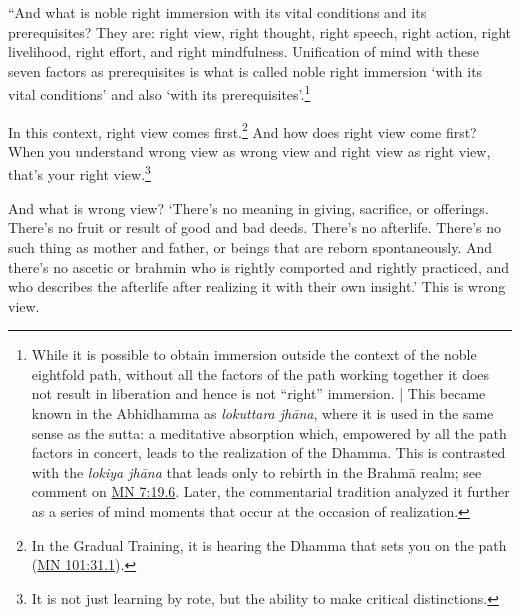 \documentclass[12pt,openany]{book}%
\begin{document}
“And what is noble right immersion with its vital conditions and its prerequisites? They are: right view, right thought, right speech, right action, right livelihood, right effort, and right mindfulness. Unification of mind with these seven factors as prerequisites is what is called noble right immersion ‘with its vital conditions’ and also ‘with its prerequisites’.\footnote{While it is possible to obtain immersion outside the context of the noble eightfold path, without all the factors of the path working together it does not result in liberation and hence is not “right” immersion. | This became known in the Abhidhamma as \textit{lokuttara \textsanskrit{jhāna}}, where it is used in the same sense as the sutta: a meditative absorption which, empowered by all the path factors in concert, leads to the realization of the Dhamma. This is contrasted with the \textit{lokiya \textsanskrit{jhāna}} that leads only to rebirth in the \textsanskrit{Brahmā} realm; see comment on \href{https://suttacentral.net/mn7/en/sujato\#19.6}{MN 7:19.6}. Later, the commentarial tradition analyzed it further as a series of mind moments that occur at the occasion of realization. } 

In this context, right view comes first.\footnote{In the Gradual Training, it is hearing the Dhamma that sets you on the path (\href{https://suttacentral.net/mn101/en/sujato\#31.1}{MN 101:31.1}). } And how does right view come first? When you understand wrong view as wrong view and right view as right view, that’s your right view.\footnote{It is not just learning by rote, but the ability to make critical distinctions. } 

And what is wrong view? ‘There’s no meaning in giving, sacrifice, or offerings. There’s no fruit or result of good and bad deeds. There’s no afterlife. There’s no such thing as mother and father, or beings that are reborn spontaneously. And there’s no ascetic or brahmin who is rightly comported and rightly practiced, and who describes the afterlife after realizing it with their own insight.’ This is wrong view. 
\end{document}
